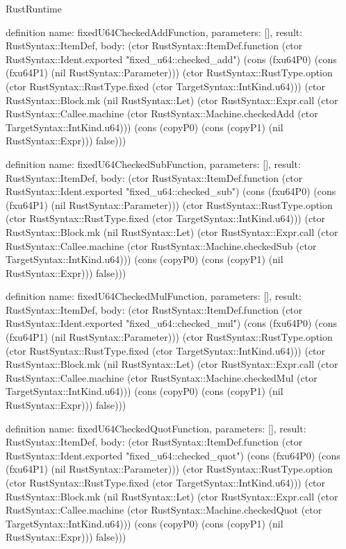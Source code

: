 \begin{lexlean}{RustRuntime}
\begin{semanticmodule}
definition{
  name: fixedU64CheckedAddFunction,
  parameters: [],
  result: RustSyntax::ItemDef,
  body: (ctor RustSyntax::ItemDef.function (ctor RustSyntax::Ident.exported "fixed_u64::checked_add") (cons (fxu64P0) (cons (fxu64P1) (nil RustSyntax::Parameter))) (ctor RustSyntax::RustType.option (ctor RustSyntax::RustType.fixed (ctor TargetSyntax::IntKind.u64))) (ctor RustSyntax::Block.mk (nil RustSyntax::Let) (ctor RustSyntax::Expr.call (ctor RustSyntax::Callee.machine (ctor RustSyntax::Machine.checkedAdd (ctor TargetSyntax::IntKind.u64))) (cons (copyP0) (cons (copyP1) (nil RustSyntax::Expr))) false)))
}

definition{
  name: fixedU64CheckedSubFunction,
  parameters: [],
  result: RustSyntax::ItemDef,
  body: (ctor RustSyntax::ItemDef.function (ctor RustSyntax::Ident.exported "fixed_u64::checked_sub") (cons (fxu64P0) (cons (fxu64P1) (nil RustSyntax::Parameter))) (ctor RustSyntax::RustType.option (ctor RustSyntax::RustType.fixed (ctor TargetSyntax::IntKind.u64))) (ctor RustSyntax::Block.mk (nil RustSyntax::Let) (ctor RustSyntax::Expr.call (ctor RustSyntax::Callee.machine (ctor RustSyntax::Machine.checkedSub (ctor TargetSyntax::IntKind.u64))) (cons (copyP0) (cons (copyP1) (nil RustSyntax::Expr))) false)))
}

definition{
  name: fixedU64CheckedMulFunction,
  parameters: [],
  result: RustSyntax::ItemDef,
  body: (ctor RustSyntax::ItemDef.function (ctor RustSyntax::Ident.exported "fixed_u64::checked_mul") (cons (fxu64P0) (cons (fxu64P1) (nil RustSyntax::Parameter))) (ctor RustSyntax::RustType.option (ctor RustSyntax::RustType.fixed (ctor TargetSyntax::IntKind.u64))) (ctor RustSyntax::Block.mk (nil RustSyntax::Let) (ctor RustSyntax::Expr.call (ctor RustSyntax::Callee.machine (ctor RustSyntax::Machine.checkedMul (ctor TargetSyntax::IntKind.u64))) (cons (copyP0) (cons (copyP1) (nil RustSyntax::Expr))) false)))
}

definition{
  name: fixedU64CheckedQuotFunction,
  parameters: [],
  result: RustSyntax::ItemDef,
  body: (ctor RustSyntax::ItemDef.function (ctor RustSyntax::Ident.exported "fixed_u64::checked_quot") (cons (fxu64P0) (cons (fxu64P1) (nil RustSyntax::Parameter))) (ctor RustSyntax::RustType.option (ctor RustSyntax::RustType.fixed (ctor TargetSyntax::IntKind.u64))) (ctor RustSyntax::Block.mk (nil RustSyntax::Let) (ctor RustSyntax::Expr.call (ctor RustSyntax::Callee.machine (ctor RustSyntax::Machine.checkedQuot (ctor TargetSyntax::IntKind.u64))) (cons (copyP0) (cons (copyP1) (nil RustSyntax::Expr))) false)))
}


\end{semanticmodule}
\end{lexlean}
